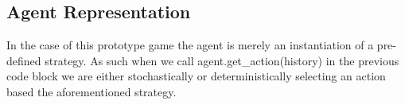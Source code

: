 \subsection{Agent Representation}\label{subsec:agent}
In the case of this prototype game the agent is merely an instantiation of a pre-defined strategy.
As such when we call agent.get\_action(history) in the previous code block we are either stochastically
or deterministically selecting an action based the aforementioned strategy.


